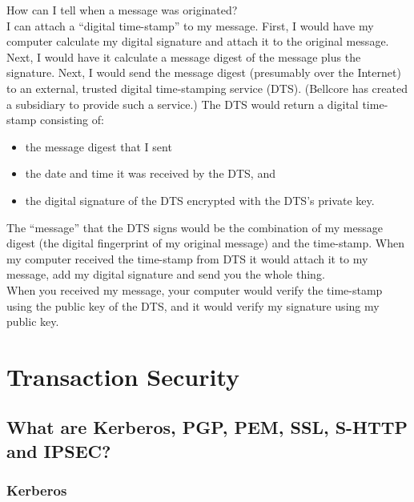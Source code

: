 How can I tell when a message was originated?\\

I can attach a ``digital time-stamp'' to my message. First, I would
have my computer calculate my digital signature and attach it to the
original message. Next, I would have it calculate a message digest of
the message plus the signature. Next, I would send the message digest
(presumably over the Internet) to an external, trusted digital
time-stamping service (DTS). (Bellcore has created a subsidiary to
provide such a service.) The DTS would return a digital time-stamp
consisting of:
\begin{itemize}
  \item the message digest that I sent
  \item the date and time it was received by the DTS, and
  \item the digital signature of the DTS encrypted with the DTS's private
    key.
\end{itemize}

The ``message'' that the DTS signs would be the combination of my
message digest (the digital fingerprint of my original message) and the
time-stamp. When my computer received the time-stamp from DTS it would
attach it to my message, add my digital signature and send you the
whole thing.\\

When you received my message, your computer would verify the time-stamp
using the public key of the DTS, and it would verify my signature using
my public key.


\section{Transaction Security}

\subsection{What are Kerberos, PGP, PEM, SSL, S-HTTP and IPSEC?}

\subsubsection{Kerberos}

